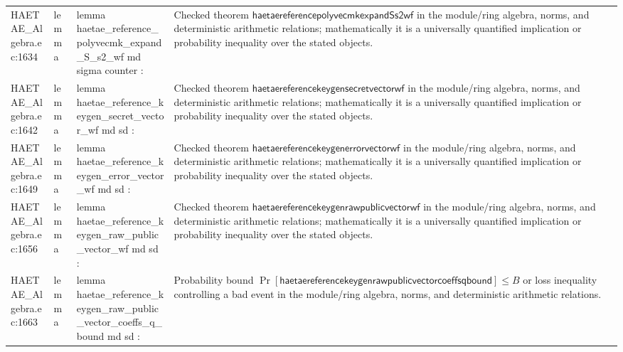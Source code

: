 \documentclass[10pt]{article}
\begin{document}
\begin{longtable}{L{0.11\textwidth}L{0.055\textwidth}L{0.385\textwidth}L{0.41\textwidth}}
HAETAE\_\allowbreak{}Algebra.\allowbreak{}ec:\allowbreak{}1634 & lemma & {\ttfamily\scriptsize lemma haetae\_\allowbreak{}reference\_\allowbreak{}polyvecmk\_\allowbreak{}expand\_\allowbreak{}S\_\allowbreak{}s2\_\allowbreak{}wf md sigma counter :} & Checked theorem $\mathsf{haetaereferencepolyvecmkexpandSs2wf}$ in the module/ring algebra, norms, and deterministic arithmetic relations; mathematically it is a universally quantified implication or probability inequality over the stated objects. \\
HAETAE\_\allowbreak{}Algebra.\allowbreak{}ec:\allowbreak{}1642 & lemma & {\ttfamily\scriptsize lemma haetae\_\allowbreak{}reference\_\allowbreak{}keygen\_\allowbreak{}secret\_\allowbreak{}vector\_\allowbreak{}wf md sd :} & Checked theorem $\mathsf{haetaereferencekeygensecretvectorwf}$ in the module/ring algebra, norms, and deterministic arithmetic relations; mathematically it is a universally quantified implication or probability inequality over the stated objects. \\
HAETAE\_\allowbreak{}Algebra.\allowbreak{}ec:\allowbreak{}1649 & lemma & {\ttfamily\scriptsize lemma haetae\_\allowbreak{}reference\_\allowbreak{}keygen\_\allowbreak{}error\_\allowbreak{}vector\_\allowbreak{}wf md sd :} & Checked theorem $\mathsf{haetaereferencekeygenerrorvectorwf}$ in the module/ring algebra, norms, and deterministic arithmetic relations; mathematically it is a universally quantified implication or probability inequality over the stated objects. \\
HAETAE\_\allowbreak{}Algebra.\allowbreak{}ec:\allowbreak{}1656 & lemma & {\ttfamily\scriptsize lemma haetae\_\allowbreak{}reference\_\allowbreak{}keygen\_\allowbreak{}raw\_\allowbreak{}public\_\allowbreak{}vector\_\allowbreak{}wf md sd :} & Checked theorem $\mathsf{haetaereferencekeygenrawpublicvectorwf}$ in the module/ring algebra, norms, and deterministic arithmetic relations; mathematically it is a universally quantified implication or probability inequality over the stated objects. \\
HAETAE\_\allowbreak{}Algebra.\allowbreak{}ec:\allowbreak{}1663 & lemma & {\ttfamily\scriptsize lemma haetae\_\allowbreak{}reference\_\allowbreak{}keygen\_\allowbreak{}raw\_\allowbreak{}public\_\allowbreak{}vector\_\allowbreak{}coeffs\_\allowbreak{}q\_\allowbreak{}bound md sd :} & Probability bound $\Pr[\mathsf{haetaereferencekeygenrawpublicvectorcoeffsqbound}]\le B$ or loss inequality controlling a bad event in the module/ring algebra, norms, and deterministic arithmetic relations. \\

\end{longtable}
\end{document}
